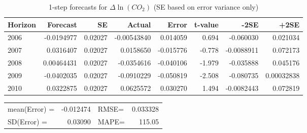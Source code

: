 \documentclass[12pt, a4paper]{article}
\begin{document}
\newpage

\begin{table}[htbp]
\caption{1-step forecasts for $\varDelta{\ln{(CO_2)}}$ (SE based on error variance only)}
\label{table}
\centering
\begin{tabular}{lrrrrrrr}
\hline
Horizon    &  Forecast  &      SE    &    Actual  &     Error &  t-value   &     -2SE &       +2SE\\
\hline\hline      
      2006  &  -0.0194977 &   0.02027  & -0.00543840 &   0.014059   &  0.694  & -0.060030 &   0.021034\\
      2007  &   0.0316407 &  0.02027  &   0.0158650  & -0.015776 &   -0.778  & -0.0088911  &  0.072173\\
      2008  &  0.00464431 &  0.02027&    -0.0354616&   -0.040106 &   -1.979&   -0.035888 &   0.045176\\
      2009 &   -0.0402035&   0.02027 &   -0.0910229&   -0.050819  &  -2.508  & -0.080735&  0.00032838\\
      2010  &   0.0322875 &  0.02027   &  0.0625572&    0.030270  &   1.494 & -0.0082443  &  0.072819\\
      \hline
\end{tabular}
\end{table}
\begin{table}[htbp]
\begin{tabular}{lrlr}
   mean(Error) = & -0.012474 & RMSE\footnotemark = & 0.033328\\
   SD(Error)   = &   0.03090& MAPE\footnotemark =  &  115.05 \\
\end{tabular}   
\end{table}
\end{document}
